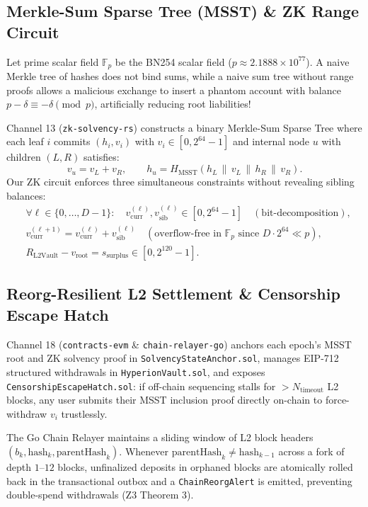 \documentclass[10pt,twocolumn]{article}
\begin{document}
\subsection{Merkle-Sum Sparse Tree (MSST) \& ZK Range Circuit}
Let prime scalar field $\mathbb{F}_p$ be the BN254 scalar field ($p \approx 2.1888 \times 10^{77}$). A naive Merkle tree of hashes does not bind sums, while a naive sum tree without range proofs allows a malicious exchange to insert a phantom account with balance $p - \delta \equiv -\delta \pmod p$, artificially reducing root liabilities!

Channel 13 (\texttt{zk-solvency-rs}) constructs a binary Merkle-Sum Sparse Tree where each leaf $i$ commits $(h_i, v_i)$ with $v_i \in [0, 2^{64}-1]$ and internal node $u$ with children $(L, R)$ satisfies:
\begin{equation}
  v_u = v_L + v_R, \qquad h_u = H_{\text{MSST}}(h_L \,\|\, v_L \,\|\, h_R \,\|\, v_R).
\end{equation}
Our ZK circuit enforces three simultaneous constraints without revealing sibling balances:
\begin{align}
  &\forall \ell \in \{0,\dots,D-1\}:\quad v_{\text{curr}}^{(\ell)}, v_{\text{sib}}^{(\ell)} \in [0, 2^{64}-1] \quad (\text{bit-decomposition}),\\
  &v_{\text{curr}}^{(\ell+1)} = v_{\text{curr}}^{(\ell)} + v_{\text{sib}}^{(\ell)} \quad (\text{overflow-free in } \mathbb{F}_p \text{ since } D \cdot 2^{64} \ll p),\\
  &R_{\text{L2Vault}} - v_{\text{root}} = s_{\text{surplus}} \in [0, 2^{120}-1].
\end{align}

\subsection{Reorg-Resilient L2 Settlement \& Censorship Escape Hatch}
Channel 18 (\texttt{contracts-evm} \& \texttt{chain-relayer-go}) anchors each epoch's MSST root and ZK solvency proof in \texttt{SolvencyStateAnchor.sol}, manages EIP-712 structured withdrawals in \texttt{HyperionVault.sol}, and exposes \texttt{CensorshipEscapeHatch.sol}: if off-chain sequencing stalls for $> N_{\text{timeout}}$ L2 blocks, any user submits their MSST inclusion proof directly on-chain to force-withdraw $v_i$ trustlessly.

The Go Chain Relayer maintains a sliding window of L2 block headers $(b_k, \mathrm{hash}_k, \mathrm{parentHash}_k)$. Whenever $\mathrm{parentHash}_{k} \neq \mathrm{hash}_{k-1}$ across a fork of depth $1\text{--}12$ blocks, unfinalized deposits in orphaned blocks are atomically rolled back in the transactional outbox and a \texttt{ChainReorgAlert} is emitted, preventing double-spend withdrawals (Z3 Theorem 3).
\end{document}

